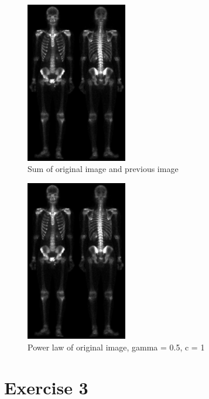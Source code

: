 \documentclass[10pt]{article}
\begin{document}
\begin{figure}[!ht]
	\centering
	\includegraphics[height=200pt]{./ex2/skeleton_final.jpg}
	\caption{Sum of original image and previous image}
\end{figure}
\begin{figure}[!ht]
	\centering
	\includegraphics[height=200pt]{./ex2/skeleton_final.jpg}
	\caption{Power law of original image, gamma = 0.5, c = 1}
\end{figure}

\clearpage

\section{Exercise 3}

\clearpage
\end{document}
